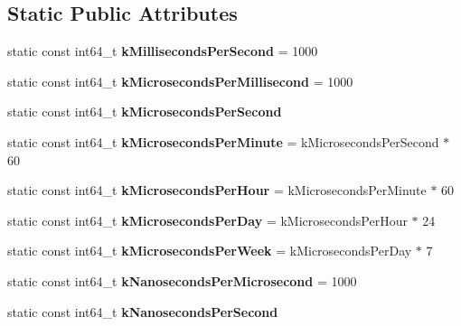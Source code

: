 \subsection*{Static Public Attributes}
\begin{DoxyCompactItemize}
\item 
static const int64\+\_\+t {\bfseries k\+Milliseconds\+Per\+Second} = 1000\hypertarget{classv8_1_1base_1_1_time_a24c4fca12b40bf7eb8574be2aa23577c}{}\label{classv8_1_1base_1_1_time_a24c4fca12b40bf7eb8574be2aa23577c}

\item 
static const int64\+\_\+t {\bfseries k\+Microseconds\+Per\+Millisecond} = 1000\hypertarget{classv8_1_1base_1_1_time_a809afbc82c5cba553c91000d180b3a4d}{}\label{classv8_1_1base_1_1_time_a809afbc82c5cba553c91000d180b3a4d}

\item 
static const int64\+\_\+t {\bfseries k\+Microseconds\+Per\+Second}
\item 
static const int64\+\_\+t {\bfseries k\+Microseconds\+Per\+Minute} = k\+Microseconds\+Per\+Second $\ast$ 60\hypertarget{classv8_1_1base_1_1_time_ac8ce8691c22f58cb2b9257a37669581b}{}\label{classv8_1_1base_1_1_time_ac8ce8691c22f58cb2b9257a37669581b}

\item 
static const int64\+\_\+t {\bfseries k\+Microseconds\+Per\+Hour} = k\+Microseconds\+Per\+Minute $\ast$ 60\hypertarget{classv8_1_1base_1_1_time_a80a69f5a8554f61b4fb02510d4416d78}{}\label{classv8_1_1base_1_1_time_a80a69f5a8554f61b4fb02510d4416d78}

\item 
static const int64\+\_\+t {\bfseries k\+Microseconds\+Per\+Day} = k\+Microseconds\+Per\+Hour $\ast$ 24\hypertarget{classv8_1_1base_1_1_time_a59baf5c27fd84eb7fbaec1f375d0395b}{}\label{classv8_1_1base_1_1_time_a59baf5c27fd84eb7fbaec1f375d0395b}

\item 
static const int64\+\_\+t {\bfseries k\+Microseconds\+Per\+Week} = k\+Microseconds\+Per\+Day $\ast$ 7\hypertarget{classv8_1_1base_1_1_time_a7ea45ea855607e70d3b3bb6a7ace1318}{}\label{classv8_1_1base_1_1_time_a7ea45ea855607e70d3b3bb6a7ace1318}

\item 
static const int64\+\_\+t {\bfseries k\+Nanoseconds\+Per\+Microsecond} = 1000\hypertarget{classv8_1_1base_1_1_time_a57b131a947400e16b37064df531d318e}{}\label{classv8_1_1base_1_1_time_a57b131a947400e16b37064df531d318e}

\item 
static const int64\+\_\+t {\bfseries k\+Nanoseconds\+Per\+Second}
\end{DoxyCompactItemize}
